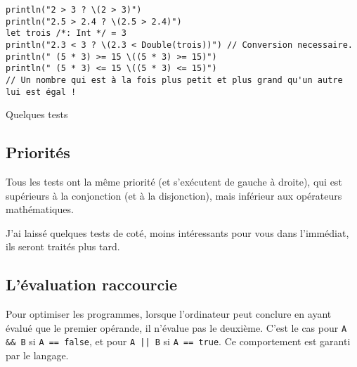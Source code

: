 \begin{listing}[h]
\begin{verbatim}
println("2 > 3 ? \(2 > 3)")
println("2.5 > 2.4 ? \(2.5 > 2.4)")
let trois /*: Int */ = 3
println("2.3 < 3 ? \(2.3 < Double(trois))") // Conversion necessaire.
println(" (5 * 3) >= 15 \((5 * 3) >= 15)")
println(" (5 * 3) <= 15 \((5 * 3) <= 15)")
// Un nombre qui est à la fois plus petit et plus grand qu'un autre lui est égal !

\end{verbatim}
\caption{Quelques tests}
\end{listing}%
\subsection{Priorités}
Tous les tests ont la même priorité
(et s'exécutent de gauche à droite),
qui est supérieurs à la conjonction (et à la disjonction),
mais inférieur aux opérateurs mathématiques.



J'ai laissé quelques tests de coté, moins intéressants pour vous dans l'immédiat, ils seront traités plus tard.
\subsection{L'évaluation raccourcie}
Pour optimiser les programmes, lorsque l'ordinateur peut conclure en ayant évalué que le premier opérande, il n'évalue pas le deuxième. C'est le cas pour \texttt{A && B} si \texttt{A == false},
et pour \texttt{A || B} si \texttt{A == true}.
Ce comportement est garanti par le langage.
